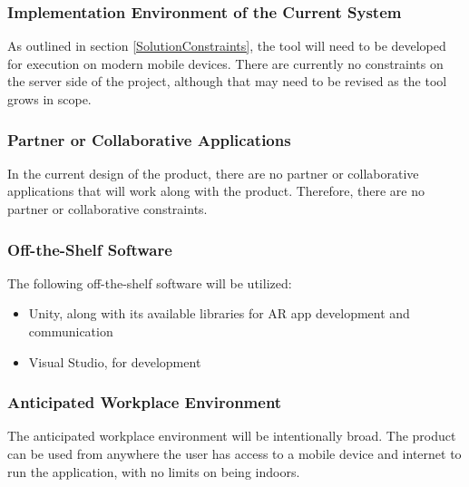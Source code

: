 \documentclass[12pt]{article}
\begin{document}
\subsubsection{Implementation Environment of the Current System}
As outlined in section \ref{SolutionConstraints}, the tool will need to be developed for execution on modern mobile devices. There are currently no constraints on the server side of the project, although that may need to be revised as the tool grows in scope. 

\subsubsection{Partner or Collaborative Applications}
In the current design of the product, there are no partner or collaborative applications that will
work along with the product. Therefore, there are no partner or collaborative constraints.

\subsubsection{Off-the-Shelf Software}
The following off-the-shelf software will be utilized:
\begin{itemize}
	\item Unity, along with its available libraries for AR app development and communication 
        \item Visual Studio, for development
\end{itemize}

\subsubsection{Anticipated Workplace Environment}
The anticipated workplace environment will be intentionally broad. The product can be used from anywhere the user has access to a mobile device and internet to run the application, with no limits on being indoors. 
\end{document}
